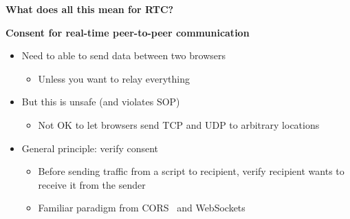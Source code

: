 \documentclass[helvetica]{seminar}
\newcommand{\heading}[1]{%
  \begin{center} 
    \large\bf 
    #1 
  \end{center} 
  \vspace{.4 in}}
\begin{document}
\begin{slide}
\heading{What does all this mean for RTC?}

\end{slide}


\begin{slide}
\heading{Consent for real-time peer-to-peer communication}

\begin{itemize}
\item Need to able to send data between two browsers
  \begin{itemize}
  \item Unless you want to relay everything
  \end{itemize}

\item But this is unsafe (and violates SOP)
  \begin{itemize}
  \item Not OK to let browsers send TCP and UDP to arbitrary locations
  \end{itemize}

\item General principle: verify consent
  \begin{itemize}
  \item Before sending traffic from a script to recipient, verify recipient
    wants to receive it from the sender
  \item Familiar paradigm from CORS~\cite{cors} and WebSockets\cite{hybi}
  \end{itemize}
\end{itemize}

\end{slide}
\end{document}
